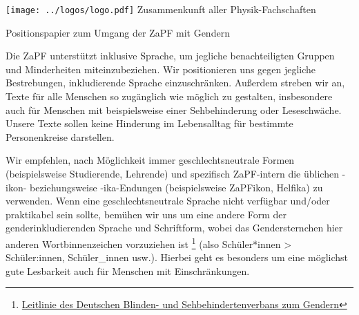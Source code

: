 \documentclass[DIV=calc]{scrartcl}
\let\oldgrqq=\grqq
\def\grqq{\oldgrqq\xspace}
\begin{document}
\hspace{0.87\textwidth}
\begin{minipage}{120pt}
	\vspace{-1.8cm}
	\texttt{[image: ../logos/logo.pdf]}
	\centering
	\small Zusammenkunft aller Physik-Fachschaften
\end{minipage}

\begin{center}
  \huge{Positionspapier zum Umgang der ZaPF mit Gendern}\vspace{.25\baselineskip}\\
  \normalsize
\end{center}
\vspace{1cm}







Die ZaPF unterstützt inklusive Sprache, um jegliche benachteiligten Gruppen und
Minderheiten miteinzubeziehen. Wir positionieren uns gegen jegliche Bestrebungen,
inkludierende Sprache einzuschränken. Außerdem streben wir an, Texte für alle
Menschen so zugänglich wie möglich zu gestalten, insbesondere auch für Menschen mit
beispielsweise einer Sehbehinderung oder Leseschwäche. Unsere Texte sollen keine
Hinderung im Lebensalltag für bestimmte Personenkreise darstellen.

Wir empfehlen, nach Möglichkeit immer geschlechtsneutrale Formen (beispielsweise Studierende,
Lehrende) und spezifisch ZaPF-intern die üblichen \glqq -ikon\grqq - beziehungsweise \glqq -ika\grqq -Endungen (beispielsweise ZaPFikon, Helfika) zu verwenden.
Wenn eine geschlechtsneutrale Sprache nicht verfügbar und/oder praktikabel sein
sollte, bemühen wir uns um eine andere Form der genderinkludierenden Sprache und
Schriftform, wobei das Gendersternchen hier anderen Wortbinnenzeichen vorzuziehen ist
\footnote{\href{https://www.dbsv.org/gendern.html}{Leitlinie des Deutschen Blinden- und Sehbehindertenverbans zum Gendern}} (also Schüler*innen > Schüler:innen,
Schüler\_innen usw.). Hierbei geht es besonders um eine möglichst gute Lesbarkeit
auch für Menschen mit Einschränkungen.
\end{document}
